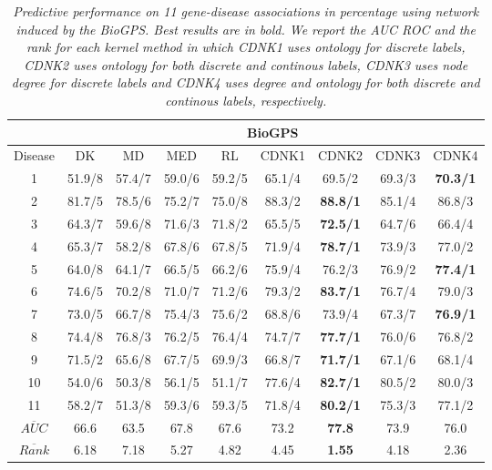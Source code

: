 \documentclass[review]{elsarticle}
\begin{document}
\begin{table}
\centering
\setlength{\tabcolsep}{1mm}
\begin{tabular}{|c|c|c|c|c|c|c|c|c|}
\hline
         & \multicolumn{8}{c|}{\textbf{BioGPS}}\\
 \hline
Disease & DK & MD & MED & RL & CDNK1 & CDNK2 & CDNK3 & CDNK4\\

 \hline
1 & 51.9/8 & 57.4/7 & 59.0/6 & 59.2/5 & 65.1/4 & 69.5/2 & 69.3/3 & \textbf{70.3/1} \\
2 & 81.7/5 & 78.5/6 & 75.2/7 & 75.0/8 & 88.3/2 & \textbf{88.8/1} & 85.1/4 & 86.8/3 \\
3 & 64.3/7 & 59.6/8 & 71.6/3 & 71.8/2 & 65.5/5 & \textbf{72.5/1} & 64.7/6 & 66.4/4 \\
4 & 65.3/7 & 58.2/8 & 67.8/6 & 67.8/5 & 71.9/4 & \textbf{78.7/1} & 73.9/3 & 77.0/2 \\
5 & 64.0/8 & 64.1/7 & 66.5/5 & 66.2/6 & 75.9/4 & 76.2/3 & 76.9/2 & \textbf{77.4/1} \\
6 & 74.6/5 & 70.2/8 & 71.0/7 & 71.2/6 & 79.3/2 & \textbf{83.7/1} & 76.7/4 & 79.0/3 \\
7 & 73.0/5 & 66.7/8 & 75.4/3 & 75.6/2 & 68.8/6 & 73.9/4 & 67.3/7 & \textbf{76.9/1} \\
8 & 74.4/8 & 76.8/3 & 76.2/5 & 76.4/4 & 74.7/7 & \textbf{77.7/1} & 76.0/6 & 76.8/2 \\
9 & 71.5/2 & 65.6/8 & 67.7/5 & 69.9/3 & 66.8/7 & \textbf{71.7/1} & 67.1/6 & 68.1/4 \\
10 & 54.0/6 & 50.3/8 & 56.1/5 & 51.1/7 & 77.6/4 & \textbf{82.7/1} & 80.5/2 & 80.0/3 \\
11 & 58.2/7 & 51.3/8 & 59.3/6 & 59.3/5 & 71.8/4 & \textbf{80.2/1} & 75.3/3 & 77.1/2 \\
\hline
$\overline{AUC}$ & 66.6 & 63.5 & 67.8 & 67.6 & 73.2 & \textbf{77.8} & 73.9 & 76.0 \\
$\overline{Rank}$ & 	6.18 & 7.18 & 5.27 & 4.82 & 4.45 & \textbf{1.55} & 4.18 & 2.36 \\
 \hline 
\end{tabular}
\caption{\textit {Predictive performance on 11 gene-disease associations in percentage using network induced by the BioGPS. Best results are in bold. We report the AUC ROC and the rank for each kernel method in which CDNK1 uses ontology for discrete labels, CDNK2 uses ontology for both discrete and continous labels, CDNK3 uses node degree for discrete labels and CDNK4 uses degree and ontology for both discrete and continous labels, respectively.}}
\label{table_biogps}
\end{table}
\end{document}

